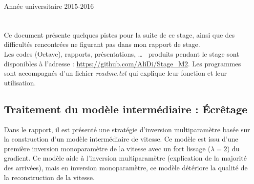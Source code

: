 \documentclass[a4paper,11pt]{report} %
\begin{document}
\begin{titlepage}
\vfill
{\large Année universitaire 2015-2016}\\[3cm] %
 



 



\end{titlepage}
\chapter*{}
Ce document présente quelques pistes pour la suite de ce stage, ainsi que des difficultés rencontrées ne figurant pas dans mon rapport de stage.\\

Les codes (Octave), rapports, présentations, \ldots~ produits pendant le stage sont disponibles à l'adresse : \url{https://github.com/AliDi/Stage_M2}. Les programmes sont accompagnés d'un fichier \emph{readme.txt} qui explique leur fonction et leur utilisation.

\section{Traitement du modèle intermédiaire : Écrêtage}
Dans le rapport, il est présenté une stratégie d'inversion multiparamètre basée sur la construction d'un modèle intermédiaire de vitesse. Ce modèle est issu d'une première inversion monoparamètre de la vitesse avec un fort lissage ($\lambda=2$) du gradient. Ce modèle aide à l'inversion multiparamètre (explication de la majorité des arrivées), mais en inversion monoparamètre, ce modèle détériore la qualité de la reconstruction de la vitesse.\\
\end{document}
